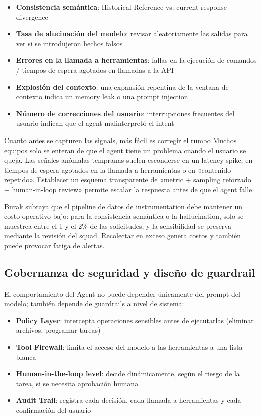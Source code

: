 \documentclass[a4paper]{article}
\begin{document}
\begin{itemize}
    \item \textbf{Consistencia semántica}: Historical Reference vs. current response divergence
    \item \textbf{Tasa de alucinación del modelo}: revisar aleatoriamente las salidas para ver si se introdujeron hechos falsos
    \item \textbf{Errores en la llamada a herramientas}: fallas en la ejecución de comandos / tiempos de espera agotados en llamadas a la API
    \item \textbf{Explosión del contexto}: una expansión repentina de la ventana de contexto indica un memory leak o una prompt injection
    \item \textbf{Número de correcciones del usuario}: interrupciones frecuentes del usuario indican que el agent malinterpretó el intent
\end{itemize}

\begin{knowledgebox}{Cuanto antes se capturen las signals, más fácil es corregir el rumbo}
Muchos equipos solo se enteran de que el agent tiene un problema cuando el usuario se queja. Las señales anómalas tempranas suelen esconderse en un latency spike, en tiempos de espera agotados en la llamada a herramientas o en «contenido repetido». Establecer un esquema transparente de «metric + sampling reforzado + human-in-loop review» permite escalar la respuesta antes de que el agent falle.
\end{knowledgebox}

Burak subraya que el pipeline de datos de instrumentation debe mantener un costo operativo bajo: para la consistencia semántica o la hallucination, solo se muestrea entre el 1 y el 2\% de las solicitudes, y la sensibilidad se preserva mediante la revisión del squad. Recolectar en exceso genera costos y también puede provocar fatiga de alertas.

\subsection{Gobernanza de seguridad y diseño de guardrail}

El comportamiento del Agent no puede depender únicamente del prompt del modelo; también depende de guardrails a nivel de sistema:

\begin{itemize}
    \item \textbf{Policy Layer}: intercepta operaciones sensibles antes de ejecutarlas (eliminar archivos, programar tareas)
    \item \textbf{Tool Firewall}: limita el acceso del modelo a las herramientas a una lista blanca
    \item \textbf{Human-in-the-loop level}: decide dinámicamente, según el riesgo de la tarea, si se necesita aprobación humana
    \item \textbf{Audit Trail}: registra cada decisión, cada llamada a herramientas y cada confirmación del usuario
\end{itemize}
\end{document}

